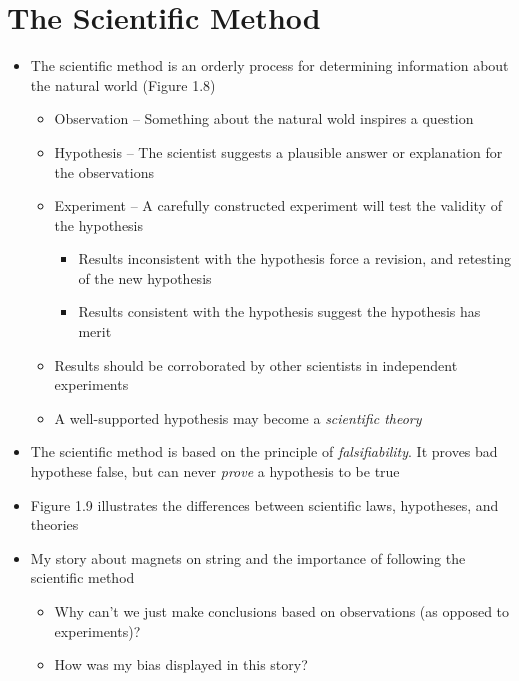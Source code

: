 \documentclass[12pt, openany, letterpaper]{memoir}
\begin{document}
\section{The Scientific Method}
\begin{itemize}
	\item The scientific method is an orderly process for determining information about the natural world (Figure 1.8)
	      \begin{itemize}
		      \item Observation -- Something about the natural wold inspires a question
		      \item Hypothesis -- The scientist suggests a plausible answer or explanation for the observations
		      \item Experiment -- A carefully constructed experiment will test the validity of the hypothesis
		            \begin{itemize}
			            \item Results inconsistent with the hypothesis force a revision, and retesting of the new hypothesis
			            \item Results consistent with the hypothesis suggest the hypothesis has merit
		            \end{itemize}
		      \item Results should be corroborated by other scientists in independent experiments
		      \item A well-supported hypothesis may become a \emph{scientific theory}
	      \end{itemize}
	\item The scientific method is based on the principle of \emph{falsifiability}. It proves bad hypothese false, but can never \emph{prove} a hypothesis to be true
	\item Figure 1.9 illustrates the differences between scientific laws, hypotheses, and theories
	\item My story about magnets on string and the importance of following the scientific method
	      \begin{itemize}
		      \item Why can't we just make conclusions based on observations (as opposed to experiments)?
		      \item How was my bias displayed in this story?
	      \end{itemize}
\end{itemize}
\end{document}
